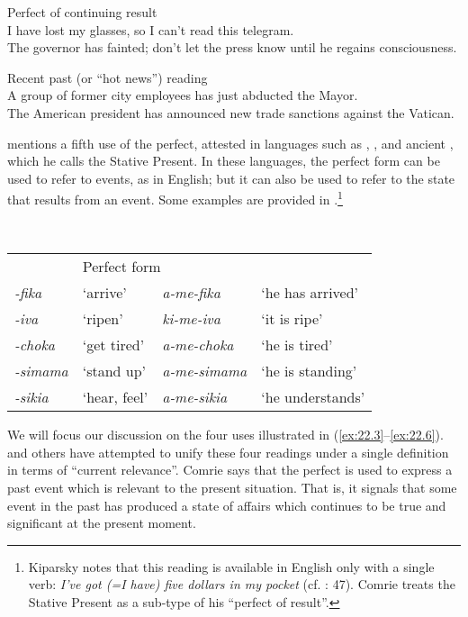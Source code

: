 \ea \label{ex:22.5}
Perfect of continuing result\\
\ea I have lost my glasses, so I can’t read this telegram.\\
\ex The governor has fainted; don’t let the press know until he regains consciousness.
                       \z
\z

\ea \label{ex:22.6}
Recent past (or “hot news”) reading\\
\ea A group of former city employees has just abducted the Mayor.\\
\ex The American president has announced new trade sanctions against the Vatican.
                       \z
\z


\citet{Kiparsky2002} mentions a fifth use of the perfect, attested in languages such as , , and ancient , which he calls the Stative Present. In these languages, the perfect form can be used to refer to events, as in English; but it can also be used to refer to the state that results from an event. Some  examples are provided in .\footnote{Kiparsky notes that this reading is available in English only with a single verb: \textit{I’ve got (=I have) five dollars in my pocket} (cf. \citealt{Jespersen1931}: 47). Comrie treats the Stative Present as a sub-type of his “perfect of result”.}


\ea \label{ex:22.7}
 \\
\begin{tabularx}{.9\textwidth}{>{\itshape}lX>{\itshape}lX}
  \multicolumn{2}{l}{Root}  & \multicolumn{2}{l}{Perfect form} \\
-fika & ‘arrive’ & a-me-fika & ‘he has arrived’\\
-iva & ‘ripen’ & ki-me-iva & ‘it is ripe’\\
-choka & ‘get tired’ & a-me-choka & ‘he is tired’\\
-simama & ‘stand up’ & a-me-simama & ‘he is standing’\\
-sikia & ‘hear, feel’ & a-me-sikia & ‘he understands’\\
\end{tabularx}
\z
We will focus our discussion on the four uses illustrated in (\ref{ex:22.3}--\ref{ex:22.6}). \citet{Comrie1976} and others have attempted to unify these four readings under a single definition in terms of “current relevance”. Comrie says that the perfect is used to express a past event which is relevant to the present situation. That is, it signals that some event in the past has produced a state of affairs which continues to be true and significant at the present moment.



